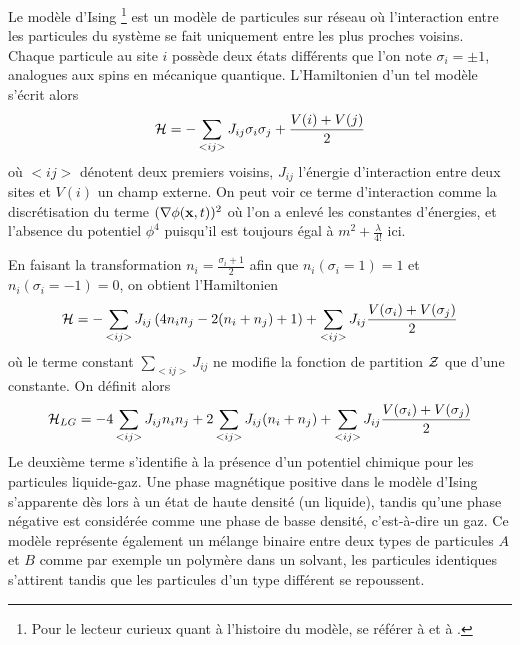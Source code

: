   	Le modèle d'Ising \footnote{Pour le lecteur curieux quant à l'histoire du modèle, se référer à \cite{niss_history_2005} et à \cite{niss_history_2009}.} est un modèle de particules sur réseau où l'interaction entre les particules du système se fait uniquement entre les plus proches voisins. Chaque particule au site $i$ possède deux états différents que l'on note $\sigma_i = \pm 1$, analogues aux spins en mécanique quantique. L'Hamiltonien d'un tel modèle s'écrit alors
\begin{equation}
	\mathcal{H} =  - \sum_{<i j >} J_{ij} \sigma_i \sigma_j + \frac{V(i)+V(j)}{2}
	\label{hamil-ising}
\end{equation}
où $< ij >$ dénotent deux premiers voisins, $J_{ij}$ l'énergie d'interaction entre deux sites et $V(i)$ un champ externe. On peut voir ce terme d'interaction comme la discrétisation du terme $(\nabla \phi({\bf x},t))^2$ où l'on a enlevé les constantes d'énergies, et l'absence du potentiel $\phi^4$ puisqu'il est toujours égal à $m^2+\frac{\lambda}{4!}$ ici. 

En faisant la transformation\cite{goldenfeld_lectures_2018} $n_i =  \frac{\sigma_i +1}{2}$ afin que $n_i(\sigma_i = 1) = 1$ et $n_i(\sigma_i = -1) = 0$, on obtient l'Hamiltonien
\begin{equation}
	\mathcal{H} =  - \sum_{< i j >}  J_{ij} \left( 4 n_i n_j -2 ( n_i+n_j) + 1 \right)+ \sum_{< i j >}  J_{ij} \frac{V(\sigma_i)+V(\sigma_j)}{2}  
\end{equation}
où le terme constant $\sum_{< i j >}  J_{ij}$ ne modifie la fonction de partition $\mathcal{Z}$ que d'une constante. On définit alors 
\begin{equation}
	\mathcal{H}_{LG} =  - 4 \sum_{< i j >}  J_{ij}  n_i n_j  + 2 \sum_{< i j >}  J_{ij}  (n_i+n_j) + \sum_{< i j >}  J_{ij} \frac{V(\sigma_i)+V(\sigma_j)}{2}  
\end{equation}
Le deuxième terme s'identifie à la présence d'un potentiel chimique pour les particules liquide-gaz. Une phase magnétique positive dans le modèle d'Ising s'apparente dès lors à un état de haute densité (un liquide), tandis qu'une phase négative est considérée comme une phase de basse densité, c'est-à-dire un gaz.
Ce modèle représente également un mélange binaire entre deux types de particules $A$ et $B$ comme par exemple un polymère dans un solvant, les particules identiques s'attirent tandis que les particules d'un type différent se repoussent. 

